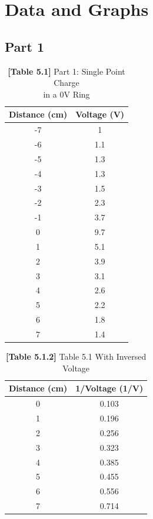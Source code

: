 \documentclass[titlepage]{article}
\begin{document}
	\section{Data and Graphs}
	\subsection{Part 1}
	\begin{center}
	\hspace{1.7cm}
	\begin{paracol}{2}
		\begin{table}[h]
		\captionsetup{justification=centering}
		\centering
		\caption*{\textbf{[Table 5.1]} Part 1: Single Point Charge\\ in a 0V Ring\\}
		\begin{tabular}{c|c}
			\textbf{Distance (cm)} & \textbf{Voltage (V)}\\
			\hline
			-7 & 1\\
			-6 & 1.1\\
			-5 & 1.3\\
			-4 & 1.3\\
			-3 & 1.5\\
			-2 & 2.3\\
			-1 & 3.7\\
			0 & 9.7\\
			1 & 5.1\\
			2 & 3.9\\
			3 & 3.1\\
			4 & 2.6\\
			5 & 2.2\\
			6 & 1.8\\
			7 & 1.4\\

		\end{tabular}
		\end{table}
	\switchcolumn
	\begin{table}[h]
		\centering
	\caption*{\textbf{[Table 5.1.2]} Table 5.1 With Inversed Voltage}
		\vspace{0.35cm}
		\begin{tabular}{c|c}
			\textbf{Distance (cm)} & \textbf{1/Voltage (1/V)}\\
			\hline
			0 & 0.103\\
			1 & 0.196\\
			2 & 0.256\\
			3 & 0.323\\
			4 & 0.385\\
			5 & 0.455\\
			6 & 0.556\\
			7 & 0.714\\
		\end{tabular}
	\end{table}
\end{paracol}
\end{center}
\end{document}
